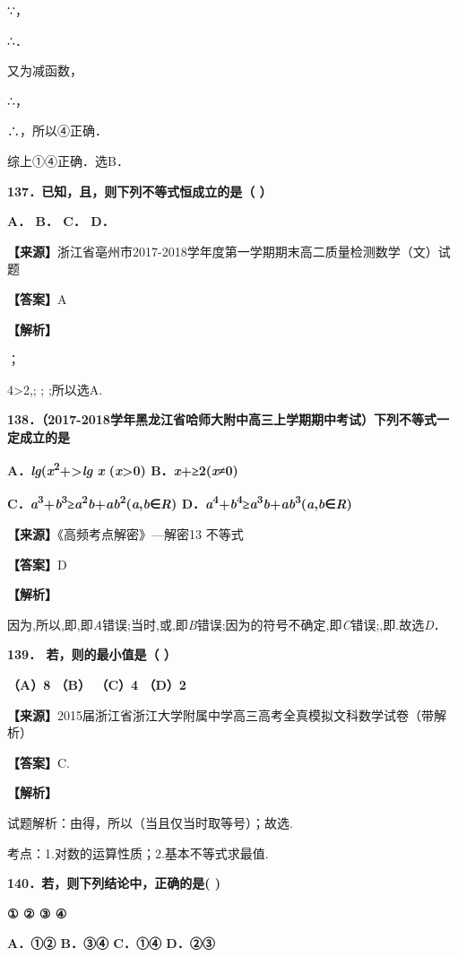 ∵，

∴．

又为减函数，

∴，

∴，所以④正确．

综上①④正确．选B．

\textbf{137．已知，且，则下列不等式恒成立的是（ ）}

\textbf{A． B． C． D．}

\textbf{【来源】}浙江省亳州市2017-2018学年度第一学期期末高二质量检测数学（文）试题

\textbf{【答案】}A

\textbf{【解析】}

；

4\textgreater2,; ; ;所以选A.

\textbf{138．（2017-2018学年黑龙江省哈师大附中高三上学期期中考试）下列不等式一定成立的是}

\textbf{A．\emph{lg}(\emph{x}\textsuperscript{2}+\textgreater{}\emph{lg}
\emph{x} (\emph{x}\textgreater0) B．\emph{x}+≥2(\emph{x}≠0)}

\textbf{C．\emph{a}\textsuperscript{3}+\emph{b}\textsuperscript{3}≥\emph{a}\textsuperscript{2}\emph{b}+\emph{ab}\textsuperscript{2}(\emph{a},\emph{b}∈\emph{R})
D．\emph{a}\textsuperscript{4}+\emph{b}\textsuperscript{4}≥\emph{a}\textsuperscript{3}\emph{b}+\emph{ab}\textsuperscript{3}(\emph{a},\emph{b}∈\emph{R})}

\textbf{【来源】}《高频考点解密》---解密13 不等式

\textbf{【答案】}D

\textbf{【解析】}

因为,所以,即,即\emph{A}错误;当时,或,即\emph{B}错误;因为的符号不确定,即\emph{C}错误;,即.故选\emph{D}．

\textbf{139． 若，则的最小值是（ ）}

\textbf{（A）8 （B） （C）4 （D）2}

\textbf{【来源】}2015届浙江省浙江大学附属中学高三高考全真模拟文科数学试卷（带解析）

\textbf{【答案】}C.

\textbf{【解析】}

试题解析：由得，所以（当且仅当时取等号）；故选.

考点：1.对数的运算性质；2.基本不等式求最值.

\textbf{140．若，则下列结论中，正确的是( )}

\textbf{① ② ③ ④}

\textbf{A．①② B．③④ C．①④ D．②③}

